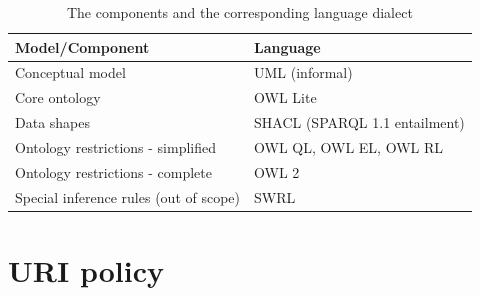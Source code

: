 	\begin{table}[!ht]
		\begin{tabular}{@{}ll@{}}
			\toprule
			Model/Component                        & Language                      \\ \midrule
			Conceptual model                       & UML (informal)                \\
			Core ontology                          & OWL Lite                      \\
			Data shapes                            & SHACL (SPARQL 1.1 entailment) \\
			Ontology restrictions - simplified     & OWL QL, OWL EL, OWL RL        \\
			Ontology restrictions - complete       & OWL 2                         \\
			Special inference rules (out of scope) & SWRL                          \\ \bottomrule
		\end{tabular}
		\caption{The components and the corresponding language dialect}
		\label{tab:expressivity}
	\end{table}
	

\section{URI policy}	
\label{sec:uri-policy}

